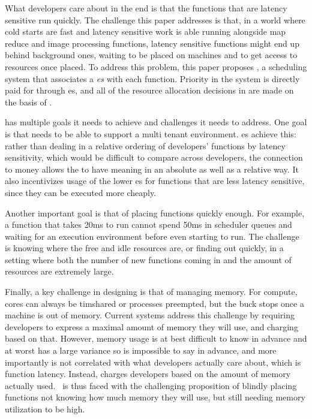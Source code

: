 What developers care about in the end is that the functions that are latency
sensitive run quickly. The challenge this paper addresses is that, in a world
where cold starts are fast and latency sensitive work is able running alongside
map reduce and image processing functions, latency sensitive functions might end
up behind background ones, waiting to be placed on machines and to get access to
resources once placed. To address this problem, this paper proposes \sys{}, a
scheduling system that associates a \textit{\priceclass{}es} with each function.
Priority in the system is directly paid for through \priceclass{}es, and all of
the resource allocation decisions in \sys{} are made on the basis of
\priceclass{}.

\Sys{} has multiple goals it needs to achieve and challenges it needs to
address. One goal is that \sys{} needs to be able to support a multi tenant
environment. \Priceclass{}es achieve this: rather than dealing in a relative
ordering of developers' functions by latency sensitivity, which would be
difficult to compare across developers, the connection to money allows the
\class{} to have meaning in an absolute as well as a relative way. It also
incentivizes usage of the lower \class{}es for functions that are less
latency sensitive, since they can be executed more cheaply.


Another important goal is that of placing functions quickly enough. For example,
a function that takes 20ms to run cannot spend 50ms in scheduler queues and
waiting for an execution environment before even starting to run. The challenge
is knowing where the free and idle resources are, or finding out quickly, in a
setting where both the number of new functions coming in and the amount of
resources are extremely large.


Finally, a key challenge in designing \sys{} is that of managing memory. For
compute, cores can always be timshared or processes preempted, but the buck
stops once a machine is out of memory. Current systems address this challenge by
requiring developers to express a maximal amount of memory they will use, and
charging based on that. However, memory usage is at best difficult to know in
advance and at worst has a large variance so is impossible to say in advance,
and more importantly is not correlated with what developers actually care about,
which is function latency. Instead, \sys{} charges developers based on the
amount of memory actually used.~\Sys{} is thus faced with the challenging
proposition of blindly placing functions not knowing how much memory they will
use, but still needing memory utilization to be high.
 
